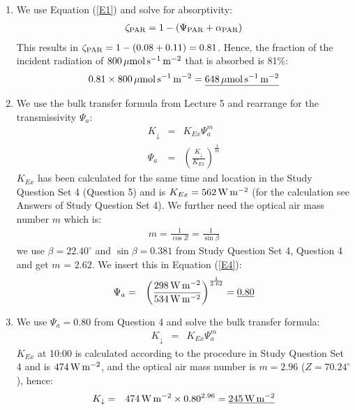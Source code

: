 \documentclass[11pt]{article}
\begin{document}
\begin{enumerate}
\item We use Equation (\ref{E1}) and solve for absorptivity:
\begin{eqnarray}
\zeta_{\rm{PAR}} = 1 - (\Psi_{\rm{PAR}} + \alpha_{\rm{PAR}})
\label{E3}
\end{eqnarray}
This results in $\zeta_{\rm{PAR}} = 1 - (0.08 + 0.11) = 0.81$. Hence, the fraction of the incident radiation of $800\,\mu \rm{mol}\,\rm{s}^{-1}\,\rm{m}^{-2}$ that is absorbed is 81\%:
\begin{eqnarray*}
0.81 \times 800\,\mu \rm{mol}\,\rm{s}^{-1}\,\rm{m}^{-2} = \underline{648\,\mu \rm{mol}\,\rm{s}^{-1}\,\rm{m}^{-2}}
\end{eqnarray*}

\item We use the bulk transfer formula from Lecture 5 and rearrange for the transmissivity $\Psi_a$:
\begin{eqnarray}
K_{\downarrow} &=& K_{Ex} \Psi_a^m \\
\Psi_a &=& \left( \frac{K_{\downarrow}}{K_{Ex}} \right) ^{\frac{1}{m}}
\label{E4}
\end{eqnarray}
$K_{Ex}$ has been calculated for the same time and location in the Study Question Set 4 (Question 5) and is $K_{Ex} = 562 \,\rm{W}\,\rm{m}^{-2}$ (for the calculation see Answers of Study Question Set 4). We further need the optical air mass number $m$ which is:
\begin{eqnarray}
m = \frac{1}{\cos Z} = \frac{1}{\sin \beta}
\end{eqnarray}
we use $\beta = 22.40^{\circ}$ and $\sin \beta = 0.381$ from Study Question Set 4, Question 4 and get $m$ = 2.62. We insert this in Equation (\ref{E4}):
\begin{eqnarray}
\Psi_a &=& \left( \frac{298\,\rm{W}\,\rm{m}^{-2}}{534\,\rm{W}\,\rm{m}^{-2}} \right) ^{\frac{1}{2.62}} = \underline{0.80}
\end{eqnarray}

\item We use  $\Psi_a = 0.80$ from Question 4 and solve the bulk transfer formula:
\begin{eqnarray}
K_{\downarrow} &=& K_{Ex} \Psi_a^m
\end{eqnarray}
$K_{Ex}$ at 10:00 is calculated according to the procedure in Study Question Set 4 and is $474 \,\rm{W}\,\rm{m}^{-2}$, and the optical air mass number is $m = 2.96$ ($Z = 70.24^{\circ}$), hence:
\begin{eqnarray}
K_{\downarrow} &=& 474 \,\rm{W}\,\rm{m}^{-2} \times 0.80^{2.96} = \underline{245 \,\rm{W}\,\rm{m}^{-2}}
\end{eqnarray}
\end{enumerate}
\end{document}
